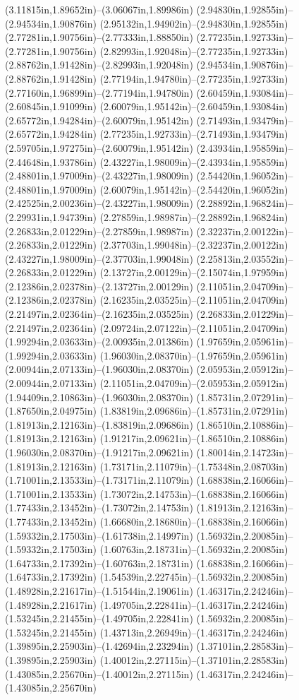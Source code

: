 (3.11815in,1.89652in)--(3.06067in,1.89986in) (2.94830in,1.92855in)--(2.94534in,1.90876in) (2.95132in,1.94902in)--(2.94830in,1.92855in) (2.77281in,1.90756in)--(2.77333in,1.88850in) (2.77235in,1.92733in)--(2.77281in,1.90756in) (2.82993in,1.92048in)--(2.77235in,1.92733in) (2.88762in,1.91428in)--(2.82993in,1.92048in) (2.94534in,1.90876in)--(2.88762in,1.91428in) (2.77194in,1.94780in)--(2.77235in,1.92733in) (2.77160in,1.96899in)--(2.77194in,1.94780in) (2.60459in,1.93084in)--(2.60845in,1.91099in) (2.60079in,1.95142in)--(2.60459in,1.93084in) (2.65772in,1.94284in)--(2.60079in,1.95142in) (2.71493in,1.93479in)--(2.65772in,1.94284in) (2.77235in,1.92733in)--(2.71493in,1.93479in) (2.59705in,1.97275in)--(2.60079in,1.95142in) (2.43934in,1.95859in)--(2.44648in,1.93786in) (2.43227in,1.98009in)--(2.43934in,1.95859in) (2.48801in,1.97009in)--(2.43227in,1.98009in) (2.54420in,1.96052in)--(2.48801in,1.97009in) (2.60079in,1.95142in)--(2.54420in,1.96052in) (2.42525in,2.00236in)--(2.43227in,1.98009in) (2.28892in,1.96824in)--(2.29931in,1.94739in) (2.27859in,1.98987in)--(2.28892in,1.96824in) (2.26833in,2.01229in)--(2.27859in,1.98987in) (2.32237in,2.00122in)--(2.26833in,2.01229in) (2.37703in,1.99048in)--(2.32237in,2.00122in) (2.43227in,1.98009in)--(2.37703in,1.99048in) (2.25813in,2.03552in)--(2.26833in,2.01229in) (2.13727in,2.00129in)--(2.15074in,1.97959in) (2.12386in,2.02378in)--(2.13727in,2.00129in) (2.11051in,2.04709in)--(2.12386in,2.02378in) (2.16235in,2.03525in)--(2.11051in,2.04709in) (2.21497in,2.02364in)--(2.16235in,2.03525in) (2.26833in,2.01229in)--(2.21497in,2.02364in) (2.09724in,2.07122in)--(2.11051in,2.04709in) (1.99294in,2.03633in)--(2.00935in,2.01386in) (1.97659in,2.05961in)--(1.99294in,2.03633in) (1.96030in,2.08370in)--(1.97659in,2.05961in) (2.00944in,2.07133in)--(1.96030in,2.08370in) (2.05953in,2.05912in)--(2.00944in,2.07133in) (2.11051in,2.04709in)--(2.05953in,2.05912in) (1.94409in,2.10863in)--(1.96030in,2.08370in) (1.85731in,2.07291in)--(1.87650in,2.04975in) (1.83819in,2.09686in)--(1.85731in,2.07291in) (1.81913in,2.12163in)--(1.83819in,2.09686in) (1.86510in,2.10886in)--(1.81913in,2.12163in) (1.91217in,2.09621in)--(1.86510in,2.10886in) (1.96030in,2.08370in)--(1.91217in,2.09621in) (1.80014in,2.14723in)--(1.81913in,2.12163in) (1.73171in,2.11079in)--(1.75348in,2.08703in) (1.71001in,2.13533in)--(1.73171in,2.11079in) (1.68838in,2.16066in)--(1.71001in,2.13533in) (1.73072in,2.14753in)--(1.68838in,2.16066in) (1.77433in,2.13452in)--(1.73072in,2.14753in) (1.81913in,2.12163in)--(1.77433in,2.13452in) (1.66680in,2.18680in)--(1.68838in,2.16066in) (1.59332in,2.17503in)--(1.61738in,2.14997in) (1.56932in,2.20085in)--(1.59332in,2.17503in) (1.60763in,2.18731in)--(1.56932in,2.20085in) (1.64733in,2.17392in)--(1.60763in,2.18731in) (1.68838in,2.16066in)--(1.64733in,2.17392in) (1.54539in,2.22745in)--(1.56932in,2.20085in) (1.48928in,2.21617in)--(1.51544in,2.19061in) (1.46317in,2.24246in)--(1.48928in,2.21617in) (1.49705in,2.22841in)--(1.46317in,2.24246in) (1.53245in,2.21455in)--(1.49705in,2.22841in) (1.56932in,2.20085in)--(1.53245in,2.21455in) (1.43713in,2.26949in)--(1.46317in,2.24246in) (1.39895in,2.25903in)--(1.42694in,2.23294in) (1.37101in,2.28583in)--(1.39895in,2.25903in) (1.40012in,2.27115in)--(1.37101in,2.28583in) (1.43085in,2.25670in)--(1.40012in,2.27115in) (1.46317in,2.24246in)--(1.43085in,2.25670in) 